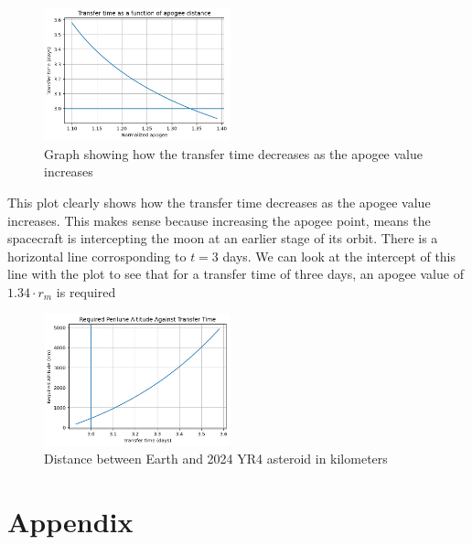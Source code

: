 \documentclass[12pt,twocolumn]{article}  %
\begin{document}
\begin{figure}[H]
    \centering
    \includegraphics[width=0.48\textwidth]{Images/222-time.png}
    \caption{Graph showing how the transfer time decreases as the apogee value increases}
\end{figure}

This plot clearly shows how the transfer time decreases as the apogee value increases. This makes sense because increasing the 
apogee point, means the spacecraft is intercepting the moon at an earlier stage of its orbit.
There is a horizontal line corrosponding to $t=3$ days. We can look at the intercept of this line with the plot to see that for a 
transfer time of three days, an apogee value of $1.34\cdot r_m$ is required
\begin{figure}[H]
    \centering
    \includegraphics[width=0.48\textwidth]{Images/223-altitude.png}
    \caption{Distance between Earth and 2024 YR4 asteroid in kilometers}
\end{figure}


\onecolumn
\section{Appendix}
   
    
\end{document}
